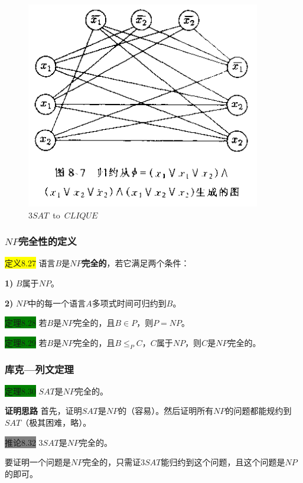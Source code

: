 \documentclass[a4paper]{article}
\begin{document}
	\begin{figure}[htb]
		\centering
		\includegraphics[scale=0.8]{./figure/8.4.1.png}
		\caption{$3SAT$~to~$CLIQUE$}
		\label{F080401}
   \end{figure} 

\subsubsection{$NP$完全性的定义}

	\colorbox{yellow}{定义8.27} 语言$B$是\textbf{$NP$完全的}，若它满足两个条件：
	
	\qquad \textbf{1)} $B$属于$NP$。

	\qquad \textbf{2)} $NP$中的每一个语言$A$多项式时间可归约到$B$。
	
	\colorbox{green}{定理8.28} 若$B$是$NP$完全的，且$B \in P$，则$P=NP$。
	
	\colorbox{green}{定理8.29} 若$B$是$NP$完全的，且$B \leq_P C$，$C$属于$NP$，则$C$是$NP$完全的。

\subsubsection{库克—列文定理}

	\colorbox{green}{定理8.30} $SAT$是$NP$完全的。
	
	\textbf{证明思路} \quad 首先，证明$SAT$是$NP$的（容易）。然后证明所有$NP$的问题都能规约到$SAT$（极其困难，略）。
	
	\colorbox{gray}{推论8.32} $3SAT$是$NP$完全的。
	
	要证明一个问题是$NP$完全的，只需证$3SAT$能归约到这个问题，且这个问题是$NP$的即可。
\end{document}
